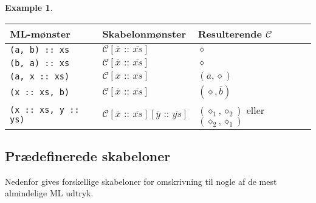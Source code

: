 \documentclass[oneside]{memoir}
\theoremstyle{definition}
\newtheorem{example}{Example}
\begin{document}
  \begin{example} \ 


    \begin{tabular}{l|l|l} 
      ML-mønster & Skabelonmønster & Resulterende
      $\mathcal{C}$ \\ \hline
      
      \texttt{(a, b) :: xs} & $\mathcal{C}[\overline{x} \texttt{ :: } \overline{xs}]$ &
      $\diamond$ \\

      \texttt{(b, a) :: xs} & $\mathcal{C}[\overline{x} \texttt{ :: } \overline{xs}]$ &
      $\diamond$ \\

      \texttt{(a, x :: xs)} & $\mathcal{C}[\overline{x} \texttt{ :: } \overline{xs}]$ &
      $(\overline{a}, \diamond)$ \\

      \texttt{(x :: xs, b)} & $\mathcal{C}[\overline{x} \texttt{ :: } \overline{xs}]$ &
      $(\diamond, \overline{b})$ \\

      \texttt{(x :: xs, y :: ys)} & $\mathcal{C}[\overline{x} \texttt{ :: }
      \overline{xs}][\overline{y} \texttt{ :: } \overline{ys}]$ &
      $(\diamond_1, \diamond_2)$ eller $(\diamond_2, \diamond_1)$\\
      
    \end{tabular}
    
  \end{example}



\subsection{Prædefinerede skabeloner}


Nedenfor gives forskellige skabeloner for omskrivning til nogle af de mest
almindelige ML udtryk.
\end{document}
